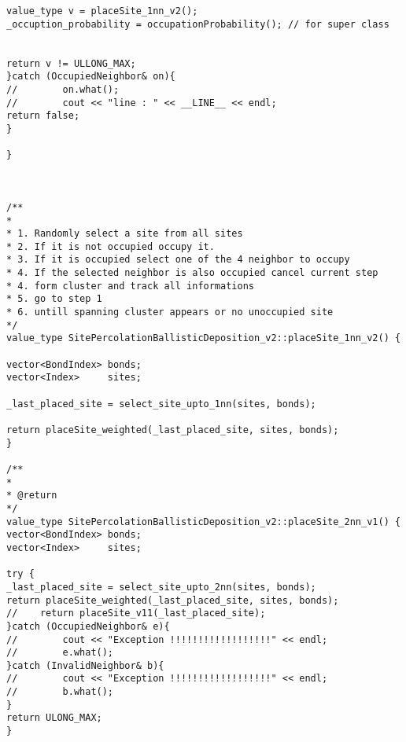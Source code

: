 \begin{lstlisting}[style=CStyle]
value_type v = placeSite_1nn_v2();
_occuption_probability = occupationProbability(); // for super class


return v != ULLONG_MAX;
}catch (OccupiedNeighbor& on){
//        on.what();
//        cout << "line : " << __LINE__ << endl;
return false;
}

}



/**
*
* 1. Randomly select a site from all sites
* 2. If it is not occupied occupy it.
* 3. If it is occupied select one of the 4 neighbor to occupy
* 4. If the selected neighbor is also occupied cancel current step
* 4. form cluster and track all informations
* 5. go to step 1
* 6. untill spanning cluster appears or no unoccupied site
*/
value_type SitePercolationBallisticDeposition_v2::placeSite_1nn_v2() {

vector<BondIndex> bonds;
vector<Index>     sites;

_last_placed_site = select_site_upto_1nn(sites, bonds);

return placeSite_weighted(_last_placed_site, sites, bonds);
}

/**
*
* @return
*/
value_type SitePercolationBallisticDeposition_v2::placeSite_2nn_v1() {
vector<BondIndex> bonds;
vector<Index>     sites;

try {
_last_placed_site = select_site_upto_2nn(sites, bonds);
return placeSite_weighted(_last_placed_site, sites, bonds);
//    return placeSite_v11(_last_placed_site);
}catch (OccupiedNeighbor& e){
//        cout << "Exception !!!!!!!!!!!!!!!!!!" << endl;
//        e.what();
}catch (InvalidNeighbor& b){
//        cout << "Exception !!!!!!!!!!!!!!!!!!" << endl;
//        b.what();
}
return ULONG_MAX;
}
\end{lstlisting}